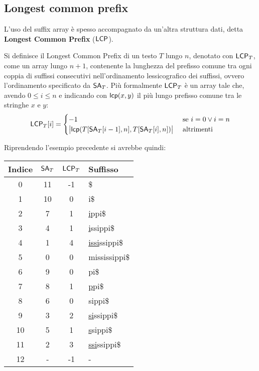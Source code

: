 \subsection{Longest common prefix}
L'uso del suffix array è spesso accompagnato da un'altra struttura
dati, detta \textbf{Longest Common Prefix} ($\mbox{\rm {\sf LCP}}$).
\begin{definizione}
  Si definisce il Longest Common Prefix di un testo $T$
  lungo $n$,
  denotato con $\mbox{\rm {\sf LCP}}_T$, come un array lungo $n+1$, contenente la
  lunghezza del prefisso comune tra ogni coppia di suffissi consecutivi
  nell'ordinamento lessicografico dei suffissi, ovvero l'ordinamento specificato
  da $\mbox{\rm {\sf SA}}_T$. Più formalmente
  $\mbox{\rm {\sf LCP}}_T$ è un array tale che, avendo $0\leq i\leq n$ e indicando con
  $\mbox{\rm {\sf lcp}}(x,y)$ il più lungo prefisso comune tra le stringhe $x$ e $y$:
  \begin{equation}
    \label{eq:lcpdef}
    \mbox{\rm {\sf LCP}}_T[i]=
    \begin{cases}
      -1&\mbox{ se } i=0 \lor i=n\\
      \big\lvert\mbox{\rm {\sf lcp}}(T[\mbox{\rm {\sf SA}}_T[i-1], n],T[\mbox{\rm {\sf SA}}_T [i], n])\big\rvert&\mbox{
        altrimenti} 
    \end{cases}
  \end{equation}
\end{definizione}
\begin{esempio}
  Riprendendo l'esempio precedente si avrebbe quindi:
  \begin{table}[H]
    \centering
    \footnotesize
    \begin{tabular}{c|c|c|l} 
      \textbf{Indice} & $\mbox{\rm {\sf SA}}_T$ & $\mbox{\rm {\sf LCP}}_T$ & \textbf{Suffisso}\\ 
      \hline
      0 & 11 & -1 & \$\\
      1 & 10 & 0 & i\$\\
      2 & 7 & 1 & \underline{i}ppi\$\\
      3 & 4 & 1 & \underline{i}ssippi\$\\
      4 & 1 & 4 & \underline{issi}ssippi\$\\
      5 & 0 & 0 & mississippi\$\\
      6 & 9 & 0 & pi\$\\
      7 & 8 & 1 & \underline{p}pi\$\\
      8 & 6 & 0 & sippi\$\\
      9 & 3 & 2 & \underline{si}ssippi\$\\
      10 & 5 & 1 & \underline{s}sippi\$\\
      11 & 2 & 3 & \underline{ssi}ssippi\$\\
      12 & - & -1 & -
    \end{tabular}
  \end{table}
\end{esempio}
